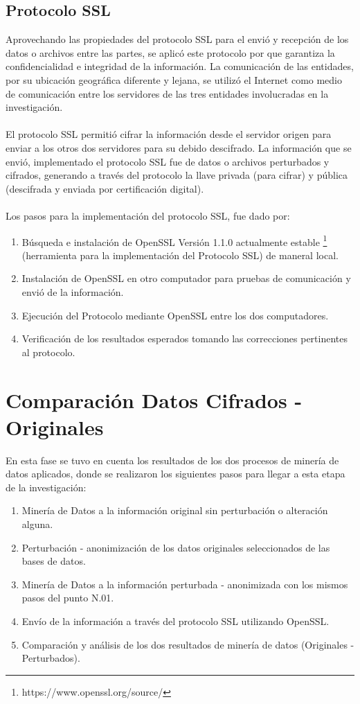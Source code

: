 \documentclass[a4paper,openright,12pt]{book}
\theoremstyle{definition}
\theoremstyle{remark}
\begin{document}
	 \subsection{Protocolo SSL}
     Aprovechando las propiedades del protocolo SSL para el envió y recepción de los datos o archivos entre las partes, se aplicó este protocolo por que garantiza la confidencialidad e integridad de la información. La comunicación de las entidades, por su ubicación geográfica diferente y lejana, se utilizó el Internet como medio de comunicación entre los servidores de las tres entidades involucradas en la investigación.\\\\ El protocolo SSL permitió cifrar la información desde el servidor origen para enviar a los otros dos servidores para su debido descifrado. La información que se envió, implementado el protocolo SSL fue de datos o archivos perturbados y cifrados, generando a través del protocolo la llave privada (para cifrar) y pública (descifrada y enviada por certificación digital).\\\\
Los pasos para la implementación del protocolo SSL, fue dado por:
\begin{enumerate}
	\item Búsqueda e instalación de OpenSSL Versión 1.1.0 actualmente estable \footnote{https://www.openssl.org/source/} (herramienta para la implementación del Protocolo SSL) de maneral local.
    \item Instalación de OpenSSL en otro computador para pruebas de comunicación y envió de la información.
    \item Ejecución del Protocolo mediante OpenSSL entre los dos computadores.
    \item Verificación de los resultados esperados tomando las correcciones pertinentes al protocolo.
\end{enumerate}

     \section{Comparación Datos Cifrados - Originales}
En esta fase se tuvo en cuenta los resultados de los dos procesos de minería de datos aplicados, donde se realizaron los siguientes pasos para llegar a esta etapa de la investigación:
\begin{enumerate}
	\item Minería de Datos a la información original sin perturbación o alteración alguna.
    \item Perturbación - anonimización de los datos originales seleccionados de las bases de datos.
    \item Minería de Datos a la información perturbada - anonimizada con los mismos pasos del punto N.01.
    \item Envío de la información a través del protocolo SSL utilizando OpenSSL.
    \item Comparación y análisis de los dos resultados de minería de datos (Originales - Perturbados).
\end{enumerate}
\end{document}
